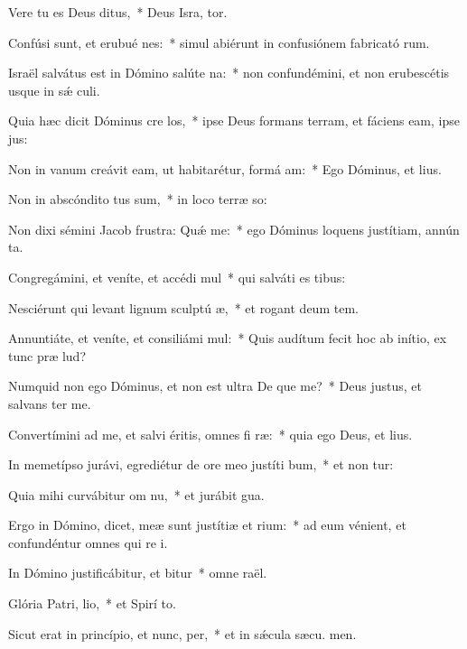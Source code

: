 \item Vere tu es Deus ditus,~* Deus Isra, tor.
\item Confúsi sunt, et erubué nes:~* simul abiérunt in confusiónem fabricató rum.
\item Israël salvátus est in Dómino salúte na:~* non confundémini, et non erubescétis usque in sǽ culi.
\item Quia hæc dicit Dóminus cre los,~* ipse Deus formans terram, et fáciens eam, ipse  jus:
\item Non in vanum creávit eam, ut habitarétur, formá am:~* Ego Dóminus, et   lius.
\item Non in abscóndito tus sum,~* in loco terræ so:
\item Non dixi sémini Jacob frustra: Quǽ me:~* ego Dóminus loquens justítiam, annún ta.
\item Congregámini, et veníte, et accédi mul~* qui salváti es  tibus:
\item Nesciérunt qui levant lignum sculptú æ,~* et rogant deum  tem.
\item Annuntiáte, et veníte, et consiliámi mul:~* Quis audítum fecit hoc ab inítio, ex tunc præ lud?
\item Numquid non ego Dóminus, et non est ultra De que me?~* Deus justus, et salvans   ter me.
\item Convertímini ad me, et salvi éritis, omnes fi ræ:~* quia ego Deus, et   lius.
\item In memetípso jurávi, egrediétur de ore meo justíti bum,~* et non tur:
\item Quia mihi curvábitur om nu,~* et jurábit  gua.
\item Ergo in Dómino, dicet, meæ sunt justítiæ et rium:~* ad eum vénient, et confundéntur omnes qui re i.
\item In Dómino justificábitur, et bitur~* omne  raël.
\item Glória Patri,  lio,~* et Spirí to.
\item Sicut erat in princípio, et nunc,  per,~* et in sǽcula sæcu. men.
